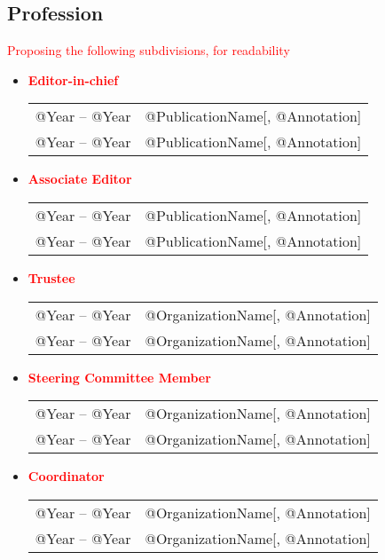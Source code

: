 \documentclass[10pt]{article}
\renewcommand{\new}[1]{\textcolor{red}{#1}}
\begin{document}
\subsection*{Profession}

\new{Proposing the following subdivisions, for readability}

\begin{itemize}
\item[] \textbf{\new{Editor-in-chief}}
\\[1.3ex]
\begin{tabular}{l@{\quad\ }p{34em}} 
 @Year -- @Year 
 & @PublicationName[, @Annotation]
 \\[.5ex]
 @Year -- @Year 
 & @PublicationName[, @Annotation]
\end{tabular}

\item[] \textbf{\new{Associate Editor}}
\\[1.3ex]
\begin{tabular}{l@{\quad\ }p{34em}} 
 @Year -- @Year 
 & @PublicationName[, @Annotation]
 \\[.5ex]
 @Year -- @Year 
 & @PublicationName[, @Annotation]
\end{tabular}

\item[] \textbf{\new{Trustee}}
\\[1.3ex]
\begin{tabular}{l@{\quad\ }p{34em}} 
 @Year -- @Year 
 & @OrganizationName[, @Annotation]
 \\[.5ex]
 @Year -- @Year 
 & @OrganizationName[, @Annotation]
\end{tabular}

\item[] \textbf{\new{Steering Committee Member}}
\\[1.3ex]
\begin{tabular}{l@{\quad\ }p{34em}} 
 @Year -- @Year 
 & @OrganizationName[, @Annotation]
 \\[.5ex]
 @Year -- @Year 
 & @OrganizationName[, @Annotation]
\end{tabular}

\item[] \textbf{\new{Coordinator}}
\\[1.3ex]
\begin{tabular}{l@{\quad\ }p{34em}} 
 @Year -- @Year 
 & @OrganizationName[, @Annotation]
 \\[.5ex]
 @Year -- @Year 
 & @OrganizationName[, @Annotation]
\end{tabular}


\end{itemize}
\end{document}
